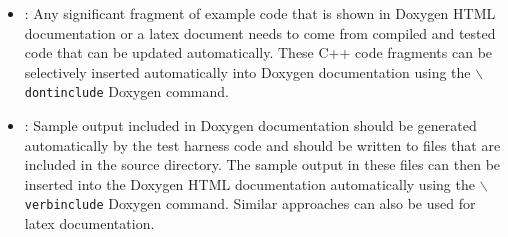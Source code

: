 \begin{itemize}
{\begin{verbatim}
    //@}

    ...

  };

\end{verbatim}}

{}\item\DOXAutogenerateExampleCode: Any significant fragment of example code
that is shown in Doxygen HTML documentation or a latex document needs to come
from compiled and tested code that can be updated automatically.  These C++
code fragments can be selectively inserted automatically into Doxygen
documentation using the {}\texttt{$\backslash$dontinclude} Doxygen command.

{}\item\DOXAutogenerateSampleOutput: Sample output included in Doxygen
documentation should be generated automatically by the test harness code and
should be written to files that are included in the source directory.  The
sample output in these files can then be inserted into the Doxygen HTML
documentation automatically using the {}\texttt{$\backslash$verbinclude}
Doxygen command.  Similar approaches can also be used for latex documentation.

\end{itemize}
